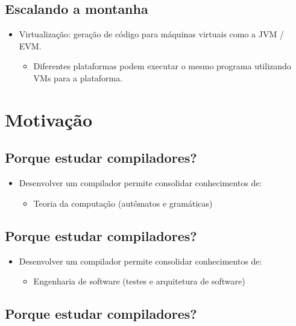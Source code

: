 \documentclass[11pt]{article}
\begin{document}
\subsection*{Escalando a montanha}
\label{sec:org5c1dfd9}

\begin{itemize}
\item Virtualização: geração de código para máquinas virtuais como a JVM / EVM.
\begin{itemize}
\item Diferentes plataformas podem executar o mesmo programa utilizando VMs para a plataforma.
\end{itemize}
\end{itemize}
\section*{Motivação}
\label{sec:orgfe68bb1}

\subsection*{Porque estudar compiladores?}
\label{sec:org82246d5}

\begin{itemize}
\item Desenvolver um compilador permite consolidar conhecimentos de:
\begin{itemize}
\item Teoria da computação (autômatos e gramáticas)
\end{itemize}
\end{itemize}
\subsection*{Porque estudar compiladores?}
\label{sec:orgfd940d8}

\begin{itemize}
\item Desenvolver um compilador permite consolidar conhecimentos de:
\begin{itemize}
\item Engenharia de software (testes e arquitetura de software)
\end{itemize}
\end{itemize}
\subsection*{Porque estudar compiladores?}
\label{sec:org4c90977}
\end{document}
